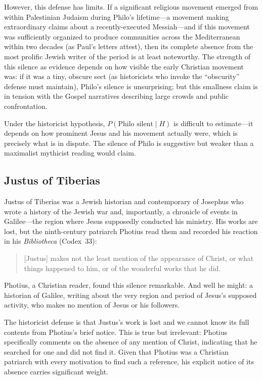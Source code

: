 \documentclass[12pt,oneside]{article}
\begin{document}
However, this defense has limits.  If a significant religious movement
emerged from within Palestinian Judaism during Philo's lifetime---a
movement making extraordinary claims about a recently-executed
Messiah---and if this movement was sufficiently organized to produce
communities across the Mediterranean within two decades (as Paul's
letters attest), then its complete absence from the most prolific Jewish
writer of the period is at least noteworthy.  The strength of this
silence as evidence depends on how visible the early Christian movement
was: if it was a tiny, obscure sect (as historicists who invoke the
``obscurity'' defense must maintain), Philo's silence is unsurprising;
but this smallness claim is in tension with the Gospel narratives
describing large crowds and public confrontation.

Under the historicist hypothesis, $P(\text{Philo silent} \mid H)$ is
difficult to estimate---it depends on how prominent Jesus and his
movement actually were, which is precisely what is in dispute.  The
silence of Philo is suggestive but weaker than a maximalist mythicist
reading would claim.

\subsection{Justus of Tiberias}
\label{sec:silence:justus}

Justus of Tiberias was a Jewish historian and contemporary of Josephus
who wrote a history of the Jewish war and, importantly, a chronicle of
events in Galilee---the region where Jesus supposedly conducted his
ministry.  His works are lost, but the ninth-century patriarch Photius
read them and recorded his reaction in his \textit{Bibliotheca}
(Codex~33):

\begin{quote}
[Justus] makes not the least mention of the appearance of Christ, or
what things happened to him, or of the wonderful works that he did.
\end{quote}

\noindent
Photius, a Christian reader, found this silence remarkable.  And well
he might: a historian of Galilee, writing about the very region and
period of Jesus's supposed activity, who makes no mention of Jesus or
his followers.

The historicist defense is that Justus's work is lost and we cannot
know its full contents from Photius's brief notice.  This is true but
irrelevant: Photius specifically comments on the absence of any mention
of Christ, indicating that he searched for one and did not find it.
Given that Photius was a Christian patriarch with every motivation to
find such a reference, his explicit notice of its absence carries
significant weight.
\end{document}

